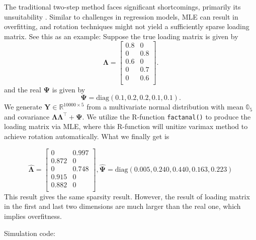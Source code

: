 \documentclass[
  a4paper,
  oneside,
  openany,
  12pt,
  onecolumn,
  twoside]{book}
\theoremstyle{plain}
\theoremstyle{remark}
\begin{document}
The traditional two-step method faces significant shortcomings,
primarily its unsuitability
\citep{hiroseSparseEstimationNonconcave2015}. Similar to challenges in
regression models, MLE can result in overfitting, and rotation
techniques might not yield a sufficiently sparse loading matrix. See
this as an example: Suppose the true loading matrix is given by \[
\boldsymbol{\Lambda}=
\begin{bmatrix}
0.8 & 0 \\
0 & 0.8 \\
0.6 & 0\\
0 & 0.7\\
0 & 0.6\\
\end{bmatrix}.
\] and the real \(\boldsymbol{\Psi}\) is given by \[
\boldsymbol{\Psi}=\text{diag}(0.1,0.2,0.2,0.1,0.1).
\] We generate \(\boldsymbol{Y}\in \mathbb{R}^{{10000}\times 5}\) from a
multivariate normal distribution with mean \(\mathbb{0}_{5}\) and
covariance
\(\boldsymbol{\Lambda}\boldsymbol{\Lambda}^\top+\boldsymbol{\Psi}\). We
utilize the R-function \texttt{factanal()} to produce the loading matrix
via MLE, where this R-function will unitize varimax method to achieve
rotation automatically. What we finally get is

\[
\hat{\boldsymbol{\Lambda}}=
\begin{bmatrix}
0 & 0.997\\
0.872 & 0\\
0 & 0.748\\
0.915 & 0\\
0.882 & 0\\
\end{bmatrix},
\hat{\boldsymbol{\Psi}}=\text{diag}(0.005,0.240,0.440,0.163,0.223)
\] This result gives the same sparsity result. However, the result of
loading matrix in the first and last two dimensions are much larger than
the real one, which implies overfitness.

Simulation code:
\end{document}
